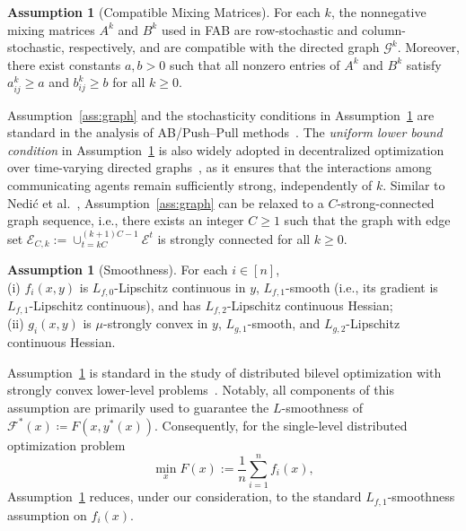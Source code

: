 \documentclass{article}
\theoremstyle{plain}
\theoremstyle{definition}
\newtheorem{assumption}[theorem]{Assumption}
\theoremstyle{remark}
\begin{document}
\begin{assumption}[Compatible Mixing Matrices]\label{ass:matrix}
    For each $k$, the nonnegative mixing matrices $A^k$ and $B^k$ used in FAB are row-stochastic and column-stochastic, respectively, and are compatible with the directed graph $\mathcal{G}^{k}$. Moreover, there exist constants $a, b >0$ such that all nonzero entries of $A^k$ and $B^k$ satisfy $a_{ij}^{k}\geq a$ and $b_{ij}^{k}\geq b$ for all $k\geq 0$.
\end{assumption}

Assumption~\ref{ass:graph} and the stochasticity conditions in Assumption~\ref{ass:matrix} are standard in the analysis of AB/Push–Pull methods~\cite{Usman_pp2018,Nedic_pp2021,yuan_pp2025}. The \textit{uniform lower bound condition} in Assumption~\ref{ass:matrix} is also widely adopted in decentralized optimization over time-varying directed graphs~\cite{Usman2020tv,nedicacc2024,Nedic2025tvd}, as it ensures that the interactions among communicating agents remain sufficiently strong, independently of $k$. 
Similar to Nedi\'{c} et al.~, Assumption~\ref{ass:graph} can be relaxed to a $C$-strong-connected graph sequence, i.e., there exists an integer $C \ge 1$ such that the graph with edge set $\mathcal{E}_{C,k} := \cup_{t=kC}^{(k+1)C-1} \mathcal{E}^{t}$ is strongly connected for all $k \ge 0$.

\begin{assumption}[Smoothness]\label{ass:functions}
    For each $i\in [n]$, \\
    (i) $f_i(x, y)$ is $L_{f,0}$-Lipschitz continuous in $y$, $L_{f,1}$-smooth (i.e., its gradient is $L_{f,1}$-Lipschitz continuous), and has $L_{f,2}$-Lipschitz continuous Hessian;\\
    (ii) $g_i(x, y)$ is $\mu$-strongly convex in $y$, $L_{g,1}$-smooth, and $L_{g,2}$-Lipschitz continuous Hessian.
\end{assumption}

Assumption~\ref{ass:functions} is standard in the study of distributed bilevel optimization with strongly convex lower-level problems~\cite{Yang_Xiao_Ma_Ji_2025,wang2025fully}. 
Notably, all components of this assumption are primarily used to guarantee the $L$-smoothness of $\mathcal{F}^{*}(x) \coloneqq F(x, y^*(x))$. Consequently, for the single-level distributed optimization problem 
\begin{equation}\label{eq:single-level-optimization}
    \min_{x}F(x):=\frac{1}{n}\sum_{i=1}^{n}f_{i}(x),
\end{equation}
Assumption~\ref{ass:functions} reduces, under our consideration, to the standard $L_{f,1}$-smoothness assumption on $f_{i}(x)$. 
\end{document}
